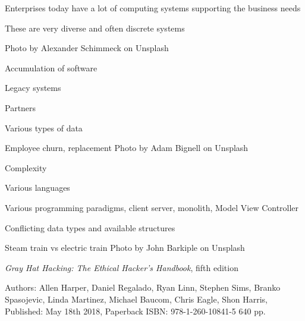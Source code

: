 \documentclass[Screen16to9,17pt]{foils}
\begin{document}



\begin{list2}
\item Enterprises today have a lot of computing systems supporting the business needs
\item These are very diverse and often discrete systems
\end{list2}

\hfill Photo by Alexander Schimmeck on Unsplash



\begin{list2}
\item Accumulation of software
\item Legacy systems
\item Partners
\item Various types of data
\item Employee churn, replacement \hfill Photo by Adam Bignell on Unsplash
\end{list2}




\begin{list2}
\item Complexity
\item Various languages
\item Various programming paradigms, client server, monolith, Model View Controller
\item Conflicting data types and available structures
\item Steam train vs electric train \hfill Photo by John Barkiple on Unsplash

\end{list2}




\emph{Gray Hat Hacking: The Ethical Hacker's Handbook}, fifth edition

Authors: Allen Harper, Daniel Regalado, Ryan Linn, Stephen Sims, Branko Spasojevic, Linda Martinez, Michael Baucom, Chris Eagle, Shon Harris, Published: May 18th 2018,
Paperback ISBN: 978-1-260-10841-5 640 pp.
\end{document}
